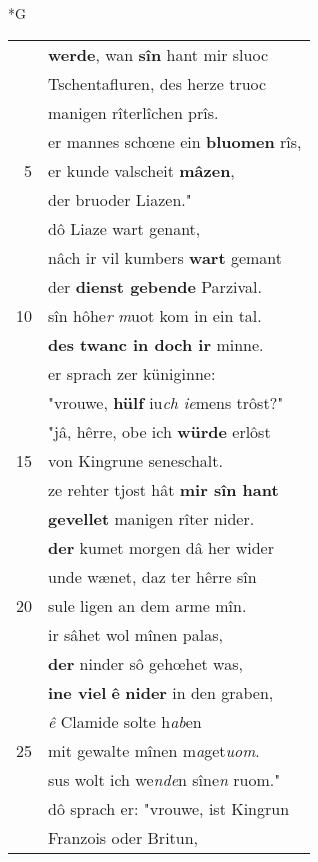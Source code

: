 \documentclass[8pt,a4paper,notitlepage]{article}
\begin{document}
\newpage
\begin{table}[ht]
\begin{minipage}[t]{0.5\linewidth}
\small
\begin{center}*G
\end{center}
\begin{tabular}{rl}
 & \textbf{werde}, wan \textbf{sîn} hant mir sluoc\\ 
 & Tschentafluren, des herze truoc\\ 
 & manigen rîterlîchen prîs.\\ 
 & er mannes schœne ein \textbf{bluomen} rîs,\\ 
5 & er kunde valscheit \textbf{mâzen},\\ 
 & der bruoder Liazen."\\ 
 & dô Liaze wart genant,\\ 
 & nâch ir vil kumbers \textbf{wart} gemant\\ 
 & der \textbf{dienst gebende} Parzival.\\ 
10 & sîn hôhe\textit{r} \textit{m}uot kom in ein tal.\\ 
 & \textbf{des twanc in doch ir} minne.\\ 
 & er sprach zer küniginne:\\ 
 & "vrouwe, \textbf{hülf} iu\textit{ch} \textit{ie}mens trôst?"\\ 
 & "jâ, hêrre, obe ich \textbf{würde} erlôst\\ 
15 & von Kingrune seneschalt.\\ 
 & ze rehter tjost hât \textbf{mir sîn hant}\\ 
 & \textbf{gevellet} manigen rîter nider.\\ 
 & \textbf{der} kumet morgen dâ her wider\\ 
 & unde wænet, daz ter hêrre sîn\\ 
20 & sule ligen an dem arme mîn.\\ 
 & ir sâhet wol mînen palas,\\ 
 & \textbf{der} ninder sô gehœhet was,\\ 
 & \textbf{ine viel} \textbf{ê} \textbf{nider} in den graben,\\ 
 & \textit{ê} Clamide solte h\textit{ab}en\\ 
25 & mit gewalte mînen m\textit{a}get\textit{uom}.\\ 
 & sus wolt ich we\textit{nde}n sîne\textit{n} ruom."\\ 
 & dô sprach er: "vrouwe, ist Kingrun\\ 
 & Franzois oder Britun,\\ 

\end{tabular}
\end{minipage}
\end{table}
\end{document}
